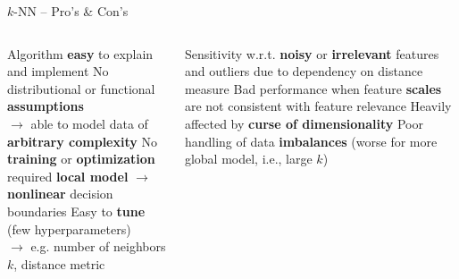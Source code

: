 \begin{frame}{$k$-NN -- Pro's \& Con's}

\footnotesize

\begin{columns}[onlytextwidth]
  \begin{column}{0.5\textwidth}
    \footnotesize
    \begin{itemize}
      \positem Algorithm \textbf{easy} to explain and implement
      \positem No distributional or functional \textbf{assumptions}\\
      $\rightarrow$ able to model data of \textbf{arbitrary complexity} %
      \positem No \textbf{training} or \textbf{optimization} required 
      \positem \textbf{local model} $\rightarrow$ \textbf{nonlinear} decision boundaries
      \positem Easy to \textbf{tune} (few hyperparameters)\\
      $\rightarrow$ e.g. number of neighbors $k$, distance metric
    \end{itemize}
  \end{column}
  \begin{column}{0.5\textwidth}
    \footnotesize
    \begin{itemize}
      \negitem Sensitivity w.r.t. \textbf{noisy} or \textbf{irrelevant} features and outliers due to dependency on distance measure
      \negitem Bad performance when feature \textbf{scales} are not consistent with feature relevance
      \negitem Heavily affected by \textbf{curse of dimensionality}
      \negitem Poor handling of data \textbf{imbalances} (worse for more global 
      model, i.e., large $k$)
    \end{itemize}
  \end{column}
\end{columns}

\vfill

\small


\end{frame}
